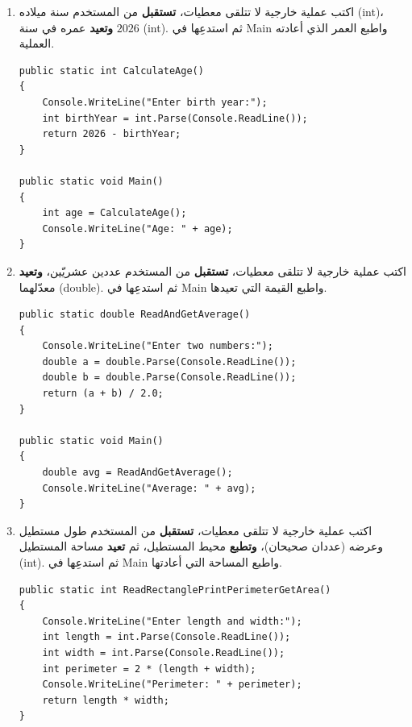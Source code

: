 \documentclass[14pt]{extarticle}
\begin{document}
\begin{enumerate}[resume, itemsep=1em]

\item اكتب عملية خارجية لا تتلقى معطيات، \textbf{تستقبل} من المستخدم سنة ميلاده (\textenglish{int})، \textbf{وتعيد} عمره في سنة $2026$ (\textenglish{int}). ثم استدعِها في \textenglish{Main} واطبع العمر الذي أعادته العملية.
\ifwithsols
\begin{boxSolution}
\begin{english}
\begin{verbatim}
public static int CalculateAge()
{
    Console.WriteLine("Enter birth year:");
    int birthYear = int.Parse(Console.ReadLine());
    return 2026 - birthYear;
}

public static void Main()
{
    int age = CalculateAge();
    Console.WriteLine("Age: " + age);
}
\end{verbatim}
\end{english}
\end{boxSolution}
\fi
\filbreak

\item اكتب عملية خارجية لا تتلقى معطيات، \textbf{تستقبل} من المستخدم عددين عشريّين، \textbf{وتعيد} معدّلهما (\textenglish{double}). ثم استدعِها في \textenglish{Main} واطبع القيمة التي تعيدها.
\ifwithsols
\begin{boxSolution}
\begin{english}
\begin{verbatim}
public static double ReadAndGetAverage()
{
    Console.WriteLine("Enter two numbers:");
    double a = double.Parse(Console.ReadLine());
    double b = double.Parse(Console.ReadLine());
    return (a + b) / 2.0;
}

public static void Main()
{
    double avg = ReadAndGetAverage();
    Console.WriteLine("Average: " + avg);
}
\end{verbatim}
\end{english}
\end{boxSolution}
\fi
\filbreak

\item اكتب عملية خارجية لا تتلقى معطيات، \textbf{تستقبل} من المستخدم طول مستطيل وعرضه (عددان صحيحان)، \textbf{وتطبع} محيط المستطيل، ثم \textbf{تعيد} مساحة المستطيل (\textenglish{int}). ثم استدعِها في \textenglish{Main} واطبع المساحة التي أعادتها.
\ifwithsols
\begin{boxSolution}
\begin{english}
\begin{verbatim}
public static int ReadRectanglePrintPerimeterGetArea()
{
    Console.WriteLine("Enter length and width:");
    int length = int.Parse(Console.ReadLine());
    int width = int.Parse(Console.ReadLine());
    int perimeter = 2 * (length + width);
    Console.WriteLine("Perimeter: " + perimeter);
    return length * width;
}


\end{verbatim}
\end{english}
\end{boxSolution}
\end{enumerate}
\end{document}
